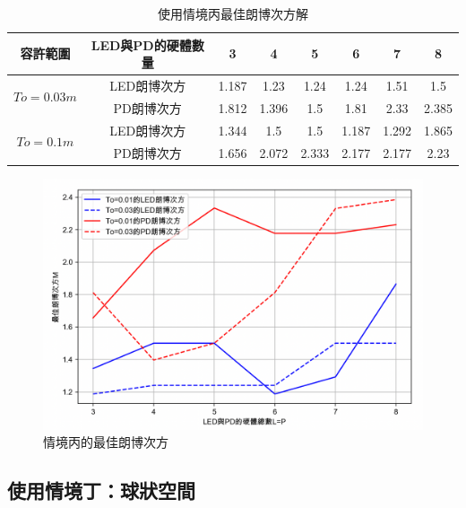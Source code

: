    \begin{table}[htpb]
        \begin{center}
          \caption{使用情境丙最佳朗博次方解}
          \label{tab:C_opt_m}
          \begin{tabular}{c|c||c|c|c|c|c|c} %
            容許範圍&LED與PD的硬體數量& 3&4&5&6&7&8\\
            \hline

            \multirow{2}{*}{$To=0.03m$}&LED朗博次方& 1.187&	1.23&	1.24	&1.24&	1.51	&1.5\\
            &PD朗博次方& 1.812&	1.396	&1.5&	1.81&	2.33	&2.385\\\hline
            
            \multirow{2}{*}{$To=0.1m$}&LED朗博次方&
            1.344&	1.5	&1.5&	1.187	&1.292&	1.865\\
            &PD朗博次方&1.656	&2.072	&2.333&	2.177	&2.177&	2.23
          \end{tabular}
        \end{center}
      \end{table}

    \begin{figure}[htpb]
        \centering
        \includegraphics[width=13cm]{ch5pic/c_opt_m.png}
        \caption{情境丙的最佳朗博次方}
        \label{pic:c_opt_m}
    \end{figure}

    


    \subsection{使用情境丁：球狀空間}
    \label{chp:optimize_D}

